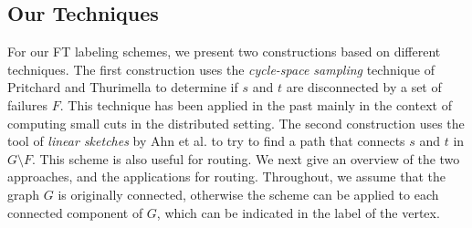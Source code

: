 \subsection{Our Techniques} \label{sec:techniques}

For our FT labeling schemes, we present two constructions based on different techniques. 
The first construction uses the \emph{cycle-space sampling} technique of Pritchard and Thurimella \cite{pritchard2011fast} to determine if $s$ and $t$ are disconnected by a set of failures $F$. This technique has been applied in the past mainly in the context of computing small cuts in the distributed setting. 
The second construction uses the tool of \emph{linear sketches} by Ahn et al. \cite{ahn2012analyzing} to try to find a path that connects $s$ and $t$ in $G \setminus F$. This scheme is also useful for routing.
We next give an overview of the two approaches, and the applications for routing. Throughout, we assume that the graph $G$ is originally connected, otherwise the scheme can be applied to each connected component of $G$, which can be indicated in the label of the vertex.

